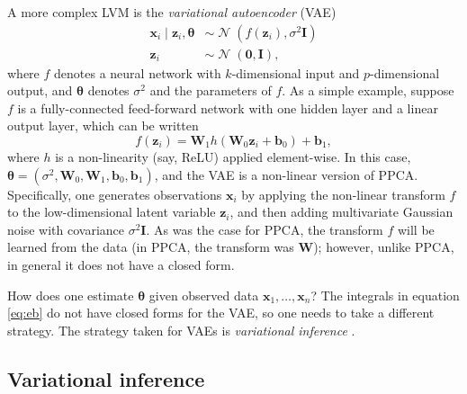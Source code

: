 \documentclass[reqno,11pt]{amsart}
\DeclareMathOperator\N{\mathcal{N}}
\newcommand\mi{\mathbf{I}}
\newcommand\mw{\mathbf{W}}
\newcommand\vb{\mathbf{b}}
\newcommand\vtheta{\boldsymbol{\theta}}
\newcommand\vx{\mathbf{x}}
\newcommand\vz{\mathbf{z}}
\begin{document}
A more complex LVM is the \emph{variational autoencoder} (VAE)
\cite{DBLP:journals/corr/KingmaW13}
%
\begin{align}
  \vx_i \mid \vz_i, \vtheta &\sim \N(f(\vz_i), \sigma^2 \mi)\\
  \vz_i &\sim \N(\boldsymbol{0}, \mi),
\end{align}
%
where $f$ denotes a neural network with $k$-dimensional input and
$p$-dimensional output, and $\vtheta$ denotes $\sigma^2$ and the parameters of
$f$. As a simple example, suppose $f$ is a fully-connected feed-forward network
with one hidden layer and a linear output layer, which can be written
%
\begin{equation}
  f(\vz_i) = \mw_1 h(\mw_0 \vz_i + \vb_0) + \vb_1,
\end{equation}
%
where $h$ is a non-linearity (say, ReLU) applied element-wise. In this case,
$\vtheta = (\sigma^2, \mw_0, \mw_1, \vb_0, \vb_1)$, and the VAE is a non-linear
version of PPCA. Specifically, one generates observations $\vx_i$ by applying
the non-linear transform $f$ to the low-dimensional latent variable $\vz_i$,
and then adding multivariate Gaussian noise with covariance $\sigma^2 \mi$. As
was the case for PPCA, the transform $f$ will be learned from the data (in
PPCA, the transform was $\mw$); however, unlike PPCA, in general it does not
have a closed form.

How does one estimate $\vtheta$ given observed data $\vx_1, \ldots, \vx_n$? The
integrals in equation \eqref{eq:eb} do not have closed forms for the VAE, so one needs
to take a different strategy. The strategy taken for VAEs is \emph{variational
inference} \cite{10.1080/01621459.2017.1285773}.

\subsection{Variational inference}
\end{document}
